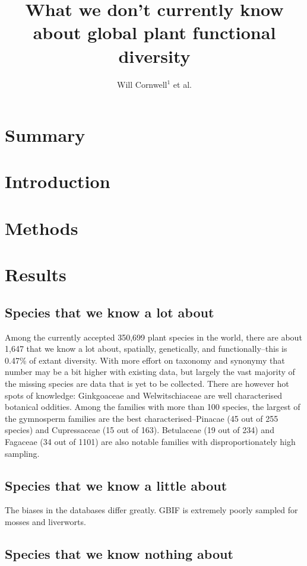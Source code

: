 \documentclass[a4paper,11pt]{article}
\title{What we don't currently know about global plant functional diversity}
\author{
Will Cornwell$^1$
et al.}
\affiliation{
*final list and order undecided\\
$^1$ University of NSW\\
}
\date{}
\begin{document}
\mstitlepage
\noindent

\section{Summary}


\section{Introduction}

\section{Methods}

\section{Results}

\subsection{Species that we know a lot about}

Among the currently accepted 350,699 plant species in the world, there are about 1,647 that we know a lot about, spatially, genetically, and functionally--this is 0.47\% of extant diversity.  With more effort on taxonomy and synonymy that number may be a bit higher with existing data, but largely the vast majority of the missing species are  data that is yet to be collected.  There are however hot spots of knowledge: Ginkgoaceae and Welwitschiaceae are well characterised botanical oddities.  Among the families with more than 100 species, the largest of the gymnosperm families are the best characterised--Pinacae (45 out of 255 species) and Cupressaceae (15 out of 163). Betulaceae (19 out of 234) and Fagaceae (34 out of 1101) are also notable families with disproportionately high sampling.  

\subsection{Species that we know a little about}

The biases in the databases differ greatly.  GBIF is extremely poorly sampled for mosses and liverworts.  

\citep{hinchliff2014some}

\subsection{Species that we know nothing about}
\end{document}
